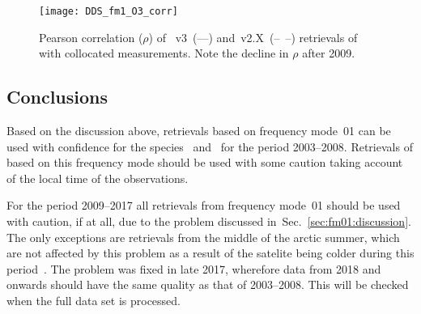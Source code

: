 \begin{figure}[ht]
    \centering
    \texttt{[image: DDS\_fm1\_O3\_corr]}
    \caption{Pearson correlation ($\rho$) of \smr~v3~(---) and~v2.X~(--~--)
    retrievals of  with collocated measurements. Note the decline in
    $\rho$ after 2009.}
    \label{fig:fm01:O3:corr}
\end{figure}


\subsection{Conclusions}
\label{sec:fm01:conclusions}
Based on the discussion above, retrievals based on frequency mode~01 can be
used with confidence for the species~ and~ for the
period 2003--2008. Retrievals of  based on this frequency mode
should be used with some caution taking account of the local time of the
observations.

For the period 2009--2017  all retrievals from frequency mode~01 should be used
with  caution, if at all, due to the problem discussed
in~Sec.~\ref{sec:fm01:discussion}. The only exceptions are retrievals from the
middle of the arctic summer, which are not affected by this problem as a result
of the satelite being colder during this period~\cite{postlaunch:2006}. The
problem was fixed in late 2017, wherefore data from 2018 and onwards should
have the same quality as that of 2003--2008. This will be checked when the full
data set is processed.

